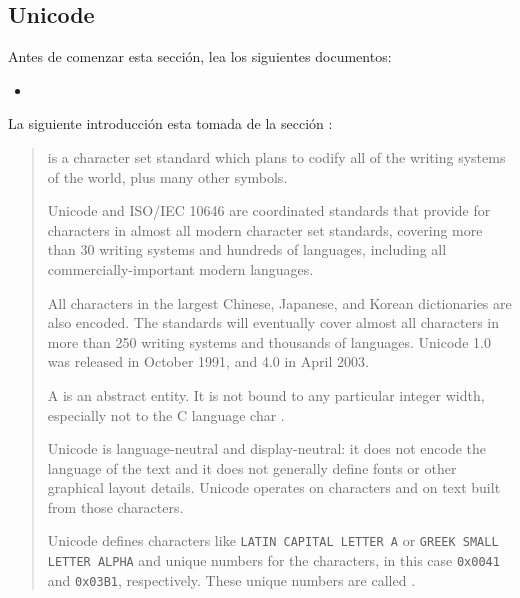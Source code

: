 \begin{htmlonly}

\section{Unicode}
\label{section:unicode}


\begin{exercise}
Antes de comenzar esta sección, lea los siguientes documentos:
\begin{itemize}
\item {}
\end{itemize}
\end{exercise}

La siguiente introducción esta tomada de la sección :

\begin{it}
\begin{quote}
 is a character set standard which plans to codify all of the
writing systems of the world, plus many other symbols.

Unicode and ISO/IEC 10646 are coordinated standards that provide 
 for characters in almost all modern character set standards,
covering more than 30 writing systems and hundreds of languages,
including all commercially-important modern languages. 

All characters
in the largest Chinese, Japanese, and Korean dictionaries are also
encoded. The standards will eventually cover almost all characters in
more than 250 writing systems and thousands of languages. Unicode 1.0
was released in October 1991, and 4.0 in April 2003.

A  is an abstract entity. It is not bound to any
particular integer width, especially not to the C language char . 

Unicode
is language-neutral and display-neutral: it does not encode the language
of the text and it does not generally define fonts or other graphical
layout details. Unicode operates on characters and on text built from
those characters.

Unicode defines characters like 
\verb|LATIN CAPITAL LETTER A| 
or \verb|GREEK SMALL LETTER ALPHA| and unique numbers for the characters, 
in this case \verb|0x0041| and \verb|0x03B1|, respectively. 
These unique numbers are called .


\end{quote}
\end{it}
\end{htmlonly}
